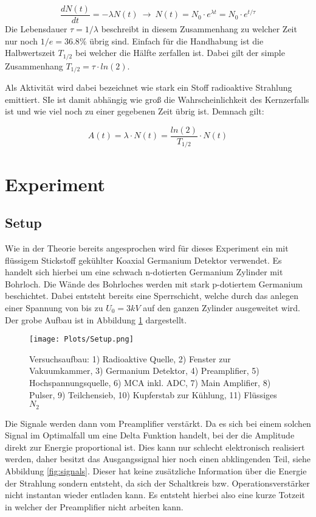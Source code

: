 \documentclass[]{article}
\begin{document}
	\begin{equation}
	\frac{dN(t)}{dt} = - \lambda N(t) \: \rightarrow \: N(t)=N_0 \cdot e^{\lambda t} = N_0 \cdot e^{t/\tau}
	\label{eq:zerfallsgesetz}
	\end{equation}
	Die Lebensdauer $ \tau = 1/\lambda $ beschreibt in diesem Zusammenhang zu welcher Zeit nur noch $1/e= 36.8\% $ übrig sind. Einfach für die Handhabung ist die Halbwertszeit $T_{1/2}$ bei welcher die Hälfte zerfallen ist. Dabei gilt der simple Zusammenhang $ T_{1/2} = \tau \cdot ln(2) $. 
	
	Als Aktivität wird dabei bezeichnet wie stark ein Stoff radioaktive Strahlung emittiert. SIe ist damit abhängig wie groß die Wahrscheinlichkeit des Kernzerfalls ist und wie viel noch zu einer gegebenen Zeit übrig ist. Demnach gilt:
	
	\begin{equation}
	A(t) = \lambda \cdot N(t) = \frac{ln(2)}{T_{1/2}} \cdot N(t)
	\label{eq:activity}
	\end{equation}
	
	
	\newpage
	\section{Experiment}
	\subsection{Setup}
	Wie in der Theorie bereits angesprochen wird für dieses Experiment ein mit flüssigem Stickstoff gekühlter Koaxial Germanium Detektor verwendet. Es handelt sich hierbei um eine schwach n-dotierten Germanium Zylinder mit Bohrloch. Die Wände des Bohrloches werden mit stark p-dotiertem Germanium beschichtet. Dabei entsteht bereits eine Sperrschicht, welche durch das anlegen einer Spannung von bis zu $U_0=3kV$ auf den ganzen Zylinder ausgeweitet wird. Der grobe Aufbau ist in Abbildung \ref{fig:setup} dargestellt.
	
	\begin{figure}[H]
		\centering
		\texttt{[image: Plots/Setup.png]}
		\caption{Versuchsaufbau: 1) Radioaktive Quelle, 2) Fenster zur Vakuumkammer, 3) Germanium Detektor, 4) Preamplifier, 5) Hochspannungsquelle, 6) MCA inkl. ADC, 7) Main Amplifier, 8) Pulser, 9) Teilchensieb, 10) Kupferstab zur Kühlung, 11) Flüssiges $N_2$  }
		\label{fig:setup}
	\end{figure}
	
	Die Signale werden dann vom Preamplifier verstärkt. Da es sich bei einem solchen Signal im Optimalfall um eine Delta Funktion handelt, bei der die Amplitude direkt zur Energie proportional ist. Dies kann nur schlecht elektronisch realisiert werden, daher besitzt das Ausgangssignal hier noch einen abklingenden Teil, siehe Abbildung \ref{fig:signals}. Dieser hat keine zusätzliche Information über die Energie der Strahlung sondern entsteht, da sich der Schaltkreis bzw. Operationsverstärker nicht instantan wieder entladen kann. Es entsteht hierbei also eine kurze Totzeit in welcher der Preamplifier nicht arbeiten kann. 
	
\end{document}
